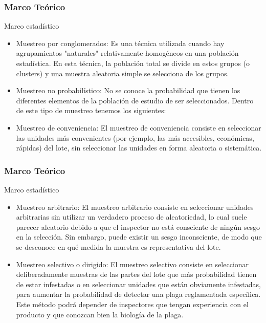 \documentclass[10pt]{beamer}
\begin{document}
\begin{frame}
\frametitle{Marco Teórico}
\begin{block}{Marco estadístico}
\begin{itemize}
\justifying
\item Muestreo por conglomerados: Es una técnica utilizada cuando hay agrupamientos "naturales" relativamente homogéneos en una población estadística. En esta técnica, la población total se divide en estos grupos (o clusters) y una muestra aleatoria simple se selecciona de los grupos.
\item Muestreo no probabilístico: No se conoce la probabilidad que tienen los diferentes elementos de la población de estudio de ser seleccionados. Dentro de este tipo de muestreo tenemos los siguientes:
\item Muestreo de conveniencia: El muestreo de conveniencia consiste en seleccionar las unidades más convenientes (por ejemplo, las más accesibles,
económicas, rápidas) del lote, sin seleccionar las unidades en forma aleatoria o sistemática.
\end{itemize}
\end{block}
\end{frame}

\begin{frame}
\frametitle{Marco Teórico}
\begin{block}{Marco estadístico}
\begin{itemize}
\justifying
\item Muestreo arbitrario: El muestreo arbitrario consiste en seleccionar unidades arbitrarias sin utilizar un verdadero proceso de aleatoriedad, lo
cual suele parecer aleatorio debido a que el inspector no está consciente de ningún sesgo en la selección. Sin embargo,
puede existir un sesgo inconsciente, de modo que se desconoce en qué medida la muestra es representativa del lote.
\item Muestreo selectivo o dirigido: El muestreo selectivo consiste en seleccionar deliberadamente muestras de las partes del lote que más probabilidad
tienen de estar infestadas o en seleccionar unidades que están obviamente infestadas, para aumentar la probabilidad de
detectar una plaga reglamentada específica. Este método podrá depender de inspectores que tengan experiencia con el
producto y que conozcan bien la biología de la plaga.
\end{itemize}
\end{block}
\end{frame}
\end{document}
